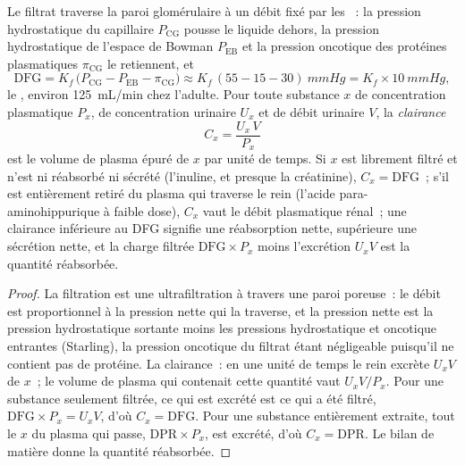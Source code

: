 \begin{theorem}\label{thm:b3:renal-osmoregulation:clearance}
Le filtrat traverse la paroi glomérulaire à un débit fixé par les
\emph{}~: la pression hydrostatique du capillaire
$P_{\text{CG}}$ pousse le liquide dehors, la pression hydrostatique de
l'espace de Bowman $P_{\text{EB}}$ et la pression oncotique des protéines
plasmatiques $\pi_{\text{CG}}$ le retiennent, et
\[
\text{DFG} = K_{f}\,\bigl(P_{\text{CG}} - P_{\text{EB}} - \pi_{\text{CG}}\bigr)
\approx K_{f}\,(55 - 15 - 30)\ \unit{mmHg} = K_{f}\times \qty{10}{mmHg},
\]
le \emph{}, environ \qty{125}{mL/min}
chez l'adulte. Pour toute substance $x$ de concentration plasmatique
$P_{x}$, de concentration urinaire $U_{x}$ et de débit urinaire $V$, la
\emph{clairance}
\[
C_{x} = \frac{U_{x}\,V}{P_{x}}
\]
est le volume de plasma épuré de $x$ par unité de temps. Si $x$ est
librement filtré et n'est ni réabsorbé ni sécrété (l'inuline, et presque
la créatinine), $C_{x} = \text{DFG}$~; s'il est entièrement retiré du
plasma qui traverse le rein (l'acide para-aminohippurique à faible
dose), $C_{x}$ vaut le débit plasmatique rénal~; une clairance
inférieure au DFG signifie une réabsorption nette, supérieure une
sécrétion nette, et la charge filtrée $\text{DFG}
\times P_{x}$ moins l'excrétion $U_{x}V$ est la quantité réabsorbée.
\end{theorem}
\begin{proof}
La filtration est une ultrafiltration à travers une paroi poreuse~: le
débit est proportionnel à la pression nette qui la traverse, et la
pression nette est la pression hydrostatique sortante moins les
pressions hydrostatique et oncotique entrantes (Starling), la pression
oncotique du filtrat étant négligeable puisqu'il ne contient pas de
protéine. La clairance~: en une unité de temps le rein excrète $U_{x}V$
de $x$~; le volume de plasma qui contenait cette quantité vaut
$U_{x}V/P_{x}$. Pour une substance seulement filtrée, ce qui est excrété
est ce qui a été filtré, $\text{DFG}\times P_{x} = U_{x}V$, d'où
$C_{x} = \text{DFG}$. Pour une substance entièrement extraite, tout le
$x$ du plasma qui passe, $\text{DPR}\times P_{x}$, est excrété, d'où
$C_{x} = \text{DPR}$. Le bilan de matière donne la quantité réabsorbée.
\end{proof}

